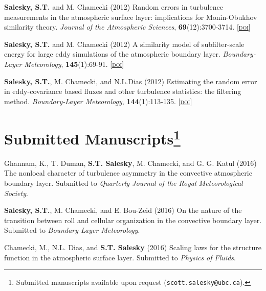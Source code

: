 \documentclass[11pt,letterpaper]{article}
\begin{document}
\textbf{Salesky, S.T.} and M. Chamecki (2012) Random errors in turbulence measurements in the atmospheric surface layer: implications for Monin-Obukhov similarity theory. \textit{Journal of the Atmospheric Sciences}, \textbf{69}(12):3700-3714. [\href{http://doi.org/10.1175/JAS-D-12-096.1}{\textsc{doi}}]

\textbf{Salesky, S.T.} and M. Chamecki  (2012) A similarity model of subfilter-scale energy for large eddy simulations of the atmospheric boundary layer. \textit{Boundary-Layer Meteorology}, \textbf{145}(1):69-91. [\href{http://doi.org/10.1007/s10546-011-9618-0}{\textsc{doi}}]

\textbf{Salesky, S.T.}, M. Chamecki, and N.L.Dias (2012) Estimating the random error in eddy-covariance based fluxes and other turbulence statistics: the filtering method. \textit{Boundary-Layer Meteorology}, \textbf{144}(1):113-135. [\href{http://doi.org/10.1007/s10546-012-9710-0}{\textsc{doi}}]



\section*{Submitted Manuscripts\footnote[2]{Submitted manuscripts available upon request (\texttt{scott.salesky@ubc.ca}).}}

Ghannam, K., T. Duman, \textbf{S.T. Salesky}, M. Chamecki, and G. G. Katul (2016)
The nonlocal character of turbulence asymmetry in the convective atmospheric boundary
layer. Submitted to \textit{Quarterly Journal of the Royal Meteorological Society}.

\textbf{Salesky, S.T.}, M. Chamecki, and E. Bou-Zeid (2016) On the nature of the transition
between roll and cellular organization in the convective boundary layer. Submitted to
\textit{Boundary-Layer Meteorology}.

Chamecki, M., N.L. Dias, and \textbf{S.T. Salesky} (2016) Scaling laws for 
the structure function in the atmospheric surface layer. Submitted to 
     \textit{Physics of Fluids}.
\end{document}
